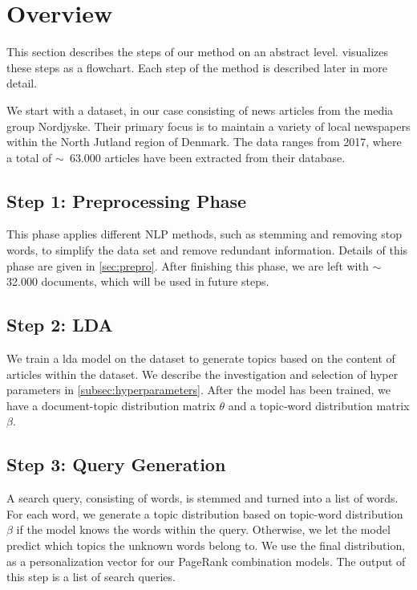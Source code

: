 \section{Overview}\label{sec:method}
This section describes the steps of our method on an abstract level.
 visualizes these steps as a flowchart.
Each step of the method is described later in more detail. 

We start with a dataset, in our case consisting of news articles from the media group Nordjyske. 
Their primary focus is to maintain a variety of local newspapers within the North Jutland region of Denmark. 
The data ranges from 2017, where a total of $\sim$~63.000 articles have been extracted from their database.

\subsection*{Step 1: Preprocessing Phase}
This phase applies different \gls{NLP} methods, such as stemming and removing stop words, to simplify the data set and remove redundant information.
Details of this phase are given in \autoref{sec:prepro}.
After finishing this phase, we are left with $\sim$32.000 documents, which will be used in future steps.

\subsection*{Step 2: LDA}
We train a \acrfull{lda} model on the dataset to generate topics based on the content of articles within the dataset. 
We describe the investigation and selection of hyper parameters in \autoref{subsec:hyperparameters}. 
After the model has been trained, we have a document-topic distribution matrix $\theta$ and a topic-word distribution matrix $\beta$.

\subsection*{Step 3: Query Generation}
A search query, consisting of words, is stemmed and turned into a list of words.
For each word, we generate a topic distribution based on topic-word distribution $\beta$ if the model knows the words within the query.
Otherwise, we let the model predict which topics the unknown words belong to.
We use the final distribution, as a personalization vector for our PageRank combination models.
The output of this step is a list of search queries.


